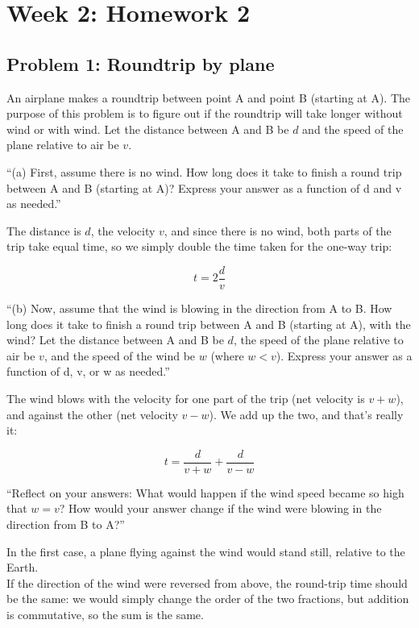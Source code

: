\documentclass[8.01x]{subfiles}
\begin{document}
\chapter{Week 2: Homework 2}

\section{Problem 1: Roundtrip by plane}

An airplane makes a roundtrip between point A and point B (starting at A). The purpose of this problem is to figure out if the roundtrip will take longer without wind or with wind. Let the distance between A and B be $d$ and the speed of the plane relative to air be $v$.

``(a) First, assume there is no wind. How long does it take to finish a round trip between A and B (starting at A)? Express your answer as a function of d and v as needed.''

The distance is $d$, the velocity $v$, and since there is no wind, both parts of the trip take equal time, so we simply double the time taken for the one-way trip:

\begin{equation}
t = 2 \frac{d}{v}
\end{equation}

``(b) Now, assume that the wind is blowing in the direction from A to B. How long does it take to finish a round trip between A and B (starting at A), with the wind? Let the distance between A and B be $d$, the speed of the plane relative to air be $v$, and the speed of the wind be $w$ (where $w < v$). Express your answer as a function of d, v, or w as needed.''

The wind blows with the velocity for one part of the trip (net velocity is $v + w$), and against the other (net velocity $v - w$). We add up the two, and that's really it:

\begin{equation}
t = \frac{d}{v + w} + \frac{d}{v - w}
\end{equation}

``Reflect on your answers: What would happen if the wind speed became so high that $w = v$? How would your answer change if the wind were blowing in the direction from B to A?''

In the first case, a plane flying against the wind would stand still, relative to the Earth.\\
If the direction of the wind were reversed from above, the round-trip time should be the same: we would simply change the order of the two fractions, but addition is commutative, so the sum is the same.
\end{document}
